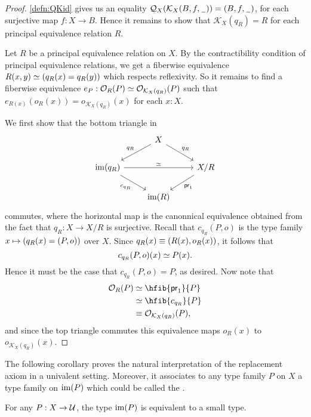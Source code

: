 \begin{proof}
\autoref{defn:QKid} gives us an equality $\mathcal{Q}_X(\mathcal{K}_X(B,f,\mathord{\hspace{1pt}\underline{\hspace{1ex}}\hspace{1pt}}))={\mathopen{}(B,f,\mathord{\hspace{1pt}\underline{\hspace{1ex}}\hspace{1pt}})\mathclose{}}$, for each surjective map $f:X\to B$. Hence it remains to show that $\mathcal{K}_X(q_R)=R$ for each principal equivalence relation $R$. 

Let $R$ be a principal equivalence relation on $X$. By the contractibility condition of principal equivalence relations, we get a fiberwise equivalence $\eqv{R(x,y)}{(q_R(x)=q_R(y))}$ which respects reflexivity.
So it remains to find a fiberwise equivalence $e_P:\eqv{\mathcal{O}_R(P)}{\mathcal{O}_{\mathcal{K}_X(q_R)}(P)}$ such that $e_{R(x)}(o_R(x))=o_{\mathcal{K}_X(q_R)}(x)$ for each $x:X$.

We first show that the bottom triangle in
\begin{equation*}
\begin{tikzcd} & X \arrow[dl,swap,"q_R"] \arrow[dr,"q_R"] \\
\im(q_R) \arrow[dr,swap,"c_{q_R}"] \arrow[rr,"\eqvsym"] & & X/R \arrow[dl,"\proj1"] \\
& \im(R)
\end{tikzcd}
\end{equation*}
commutes, where the horizontal map is the canonnical equivalence obtained from the fact that $q_R:X\to X/R$ is surjective. Recall that $c_{q_R}(P,o)$ is the type family $x\mapsto (q_R(x)={\mathopen{}(P,o)\mathclose{}})$ over $X$. Since $q_R(x)\equiv{\mathopen{}(R(x),o_R(x))\mathclose{}}$, it follows that
\begin{equation*}
c_{q_R}(P,o)(x)\simeq P(x).
\end{equation*}
Hence it must be the case that $c_{q_R}(P,o)=P$, as desired. Now note that 
\begin{align*}
\mathcal{O}_R(P)
& \eqvsym \hfib{\proj1}{P} \\
& \eqvsym \hfib{c_{q_R}}{P} \\
& \jdeq \mathcal{O}_{\mathcal{K}_X(q_R)}(P),
\end{align*}
and since the top triangle commutes this equivalence maps $o_R(x)$ to $o_{\mathcal{K}_X(q_R)}(x)$. 
\end{proof}

The following corollary proves the natural interpretation of the replacement axiom in a univalent setting. Moreover, it associates to any type family $P$ on $X$ a type family on $\operatorname{im}(P)$ which could be called the . 

\begin{cor}
For any $P:X\to\mathcal{U}$, the type $\operatorname{im}(P)$ is equivalent to a small type.
\end{cor}

